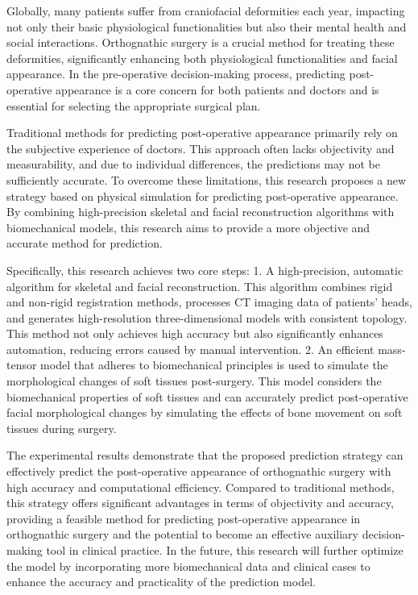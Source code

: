 \begin{abstract*}
  Globally, many patients suffer from craniofacial deformities each year, impacting not only their basic physiological functionalities but also their mental health and social interactions.
  Orthognathic surgery is a crucial method for treating these deformities, significantly enhancing both physiological functionalities and facial appearance.
  In the pre-operative decision-making process, predicting post-operative appearance is a core concern for both patients and doctors and is essential for selecting the appropriate surgical plan.

  Traditional methods for predicting post-operative appearance primarily rely on the subjective experience of doctors.
  This approach often lacks objectivity and measurability, and due to individual differences, the predictions may not be sufficiently accurate.
  To overcome these limitations, this research proposes a new strategy based on physical simulation for predicting post-operative appearance.
  By combining high-precision skeletal and facial reconstruction algorithms with biomechanical models, this research aims to provide a more objective and accurate method for prediction.

  Specifically, this research achieves two core steps:
  1. A high-precision, automatic algorithm for skeletal and facial reconstruction.
  This algorithm combines rigid and non-rigid registration methods, processes CT imaging data of patients' heads, and generates high-resolution three-dimensional models with consistent topology.
  This method not only achieves high accuracy but also significantly enhances automation, reducing errors caused by manual intervention.
  2. An efficient mass-tensor model that adheres to biomechanical principles is used to simulate the morphological changes of soft tissues post-surgery.
  This model considers the biomechanical properties of soft tissues and can accurately predict post-operative facial morphological changes by simulating the effects of bone movement on soft tissues during surgery.

  The experimental results demonstrate that the proposed prediction strategy can effectively predict the post-operative appearance of orthognathic surgery with high accuracy and computational efficiency.
  Compared to traditional methods, this strategy offers significant advantages in terms of objectivity and accuracy, providing a feasible method for predicting post-operative appearance in orthognathic surgery and the potential to become an effective auxiliary decision-making tool in clinical practice.
  In the future, this research will further optimize the model by incorporating more biomechanical data and clinical cases to enhance the accuracy and practicality of the prediction model.

\end{abstract*}
